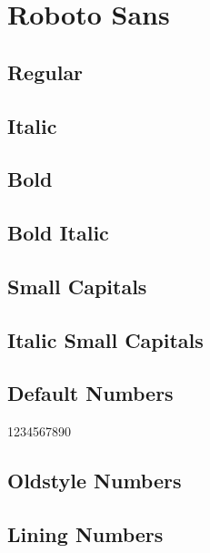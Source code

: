 \documentclass{article}
\begin{document}
\section*{Roboto Sans}

\sffamily

\subsection*{Regular}
\lipsum[1]

\subsection*{Italic}
\textit{\lipsum[2]}

\subsection*{Bold}

\textbf{\lipsum[3]}



\subsection*{Bold Italic}

\textbf{\textit{\lipsum[4]}}

\subsection*{Small Capitals}

\textsc{\lipsum[1]}

\subsection*{Italic Small Capitals}

\textsc{\textit{\lipsum[2]}}

\subsection*{Default Numbers}

1234567890

\subsection*{Oldstyle Numbers}


\subsection*{Lining Numbers}
\end{document}

